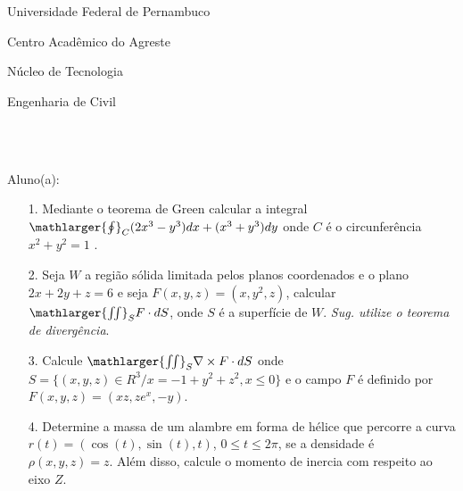 \documentclass[oneside,a4paper,12pt]{article}
\newcommand{\universidade}{Universidade Federal de Pernambuco}
\newcommand{\centro}{Centro Acadêmico do Agreste}
\newcommand{\departamento}{Núcleo de Tecnologia}
\newcommand{\curso}{Engenharia de Civil}
\begin{document}
	\pagestyle{empty}
	
	\begin{center}
	 	\vspace{0pt}
	 	
		\universidade
		\par
		\centro
		\par
		\departamento
		\par
		\curso
		\par
		\vspace{08pt}
		\\ \\
	\end{center}
	
	
	\begin{flushleft}
		Aluno(a):
	\end{flushleft}
	
\begin{itemize}
\item[1.] Mediante o teorema de Green calcular a integral $\mathlarger{\oint}_{C} (2x^{3}-y^{3})dx+(x^{3}+y^{3})dy$ onde $C$ é o circunferência $x^{2}+y^{2}=1$ .
\end{itemize}
\begin{itemize}
\item[2.] Seja $W$ a região sólida limitada pelos planos coordenados e o plano $2x+2y+z=6$ e seja $F(x,y,z)=(x,y^{2},z)$, calcular $\mathlarger{\iint}_{S}F\cdot dS$, onde $S$ é a superfície de $W$. \textit{Sug. utilize o teorema de divergência}. 
 \end{itemize}
 \begin{itemize}
\item [3.] Calcule $\mathlarger{\iint}_{S} \nabla \times F\cdot dS$ onde $S=\{(x,y,z)\in R^{3}/ x=-1+y^{2}+z^{2}, x\leq 0 \}$ e o campo $F$ é definido por $F(x,y,z)=(xz,ze^{x},-y)$.
\end{itemize}
\begin{itemize}
\item[4.] Determine a massa de um alambre em forma de hélice que percorre a curva $r(t)=(\cos(t),\sin(t),t)$, $0\leq t\leq2\pi$, se a densidade é $\rho(x,y,z)=z$. Além disso, calcule o momento de inercia com respeito ao eixo $Z$.
\end{itemize}
\end{document}
